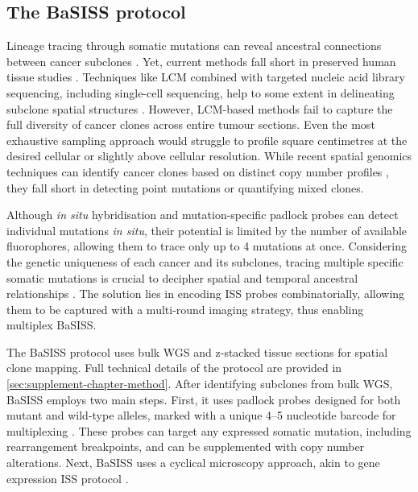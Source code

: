 \subsection{The \ac{BaSISS} protocol}
\label{sec:basiss-intro}
Lineage tracing through somatic mutations can reveal ancestral connections between cancer subclones . Yet, current methods fall short in preserved human tissue studies \parencite{Yates2015-xk,Jamal-Hanjani2017-uv,Jones2008-sd,Shah2009-xz,Casasent2018-gx,Tarabichi2021-xx}. Techniques like \acf{LCM} combined with targeted nucleic acid library sequencing, including single-cell sequencing, help to some extent in delineating subclone spatial structures \parencite{Shen2000-xj,Casasent2018-gx}. However, \ac{LCM}-based methods fail to capture the full diversity of cancer clones across entire tumour sections. Even the most exhaustive sampling approach would struggle to profile square centimetres at the desired cellular or slightly above cellular resolution. While recent spatial genomics techniques can identify cancer clones based on distinct copy number profiles \parencite{Zhao2022-xd,Erickson2022-zh}, they fall short in detecting point mutations or quantifying mixed clones.

Although \textit{in situ} hybridisation \parencite{Janiszewska2015-kb} and mutation-specific padlock probes \parencite{Larsson2010-bp,Grundberg2013-te,Ke2013-ux,Baker2017-dv} can detect individual mutations \textit{in situ}, their potential is limited by the number of available fluorophores, allowing them to trace only up to 4 mutations at once. Considering the genetic uniqueness of each cancer and its subclones, tracing multiple specific somatic mutations is crucial to decipher spatial and temporal ancestral relationships \parencite{Nik-Zainal2012-zz}. The solution lies in encoding \acl{ISS} probes combinatorially, allowing them to be captured with a multi-round imaging strategy, thus enabling multiplex \acf{BaSISS}.


The \ac{BaSISS} protocol uses bulk \ac{WGS} and z-stacked tissue sections for spatial clone mapping. Full technical details of the protocol are provided in \cref{sec:supplement-chapter-method}. After identifying subclones from bulk \ac{WGS}, \ac{BaSISS} employs two main steps. First, it uses padlock probes designed for both mutant and wild-type alleles, marked with a unique 4–5 nucleotide barcode for multiplexing \parencite{Ke2013-ux}. These probes can target any expressed somatic mutation, including rearrangement breakpoints, and can be supplemented with copy number alterations. Next, \ac{BaSISS}  uses a cyclical microscopy approach, akin to gene expression \acl{ISS} protocol \parencite{Ke2013-ux,Svedlund2019-xb} .

